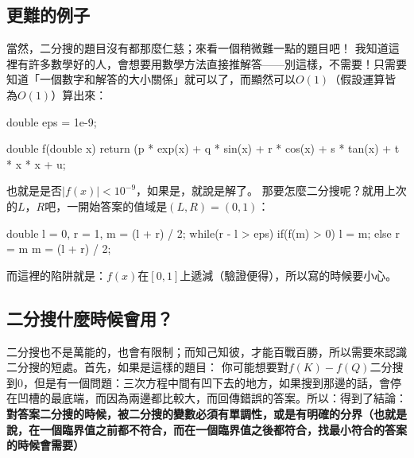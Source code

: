 \documentclass[main.tex]{subfiles}
\begin{document}
	\subsection{更難的例子}
		當然，二分搜的題目沒有都那麼仁慈；來看一個稍微難一點的題目吧！
		我知道這裡有許多數學好的人，會想要用數學方法直接推解答——別這樣，不需要！只需要知道「一個數字和解答的大小關係」就可以了，而顯然可以$O(1)$（假設運算皆為$O(1)$）算出來：
		\begin{C++}
double eps = 1e-9;

double f(double x){
	return (p * exp(x) + q * sin(x) + r * cos(x) + s * tan(x) + t * x * x + u;	
}
		\end{C++}
		也就是是否$|f(x)| < 10^{-9}$，如果是，就說是解了。
		那要怎麼二分搜呢？就用上次的$L$，$R$吧，一開始答案的值域是$(L, R) = (0, 1)$：
		\begin{C++}
double l = 0, r = 1, m = (l + r) / 2;
while(r - l > eps){
	if(f(m) > 0){
		l = m;	
	} else {
		r = m
	}
	m = (l + r) / 2;
}
		\end{C++}
		而這裡的陷阱就是：$f(x)$在$[0, 1]$上遞減（驗證便得），所以寫的時候要小心。
	\subsection{二分搜什麼時候會用？}
		二分搜也不是萬能的，也會有限制；而知己知彼，才能百戰百勝，所以需要來認識二分搜的短處。首先，如果是這樣的題目：
		你可能想要對$f(K) - f(Q)$二分搜到$0$，但是有一個問題：三次方程中間有凹下去的地方，如果搜到那邊的話，會停在凹槽的最底端，而因為兩邊都比較大，而回傳錯誤的答案。所以：得到了結論：\textbf{對答案二分搜的時候，被二分搜的變數必須有單調性，或是有明確的分界（也就是說，在一個臨界值之前都不符合，而在一個臨界值之後都符合，找最小符合的答案的時候會需要）}
\end{document}
